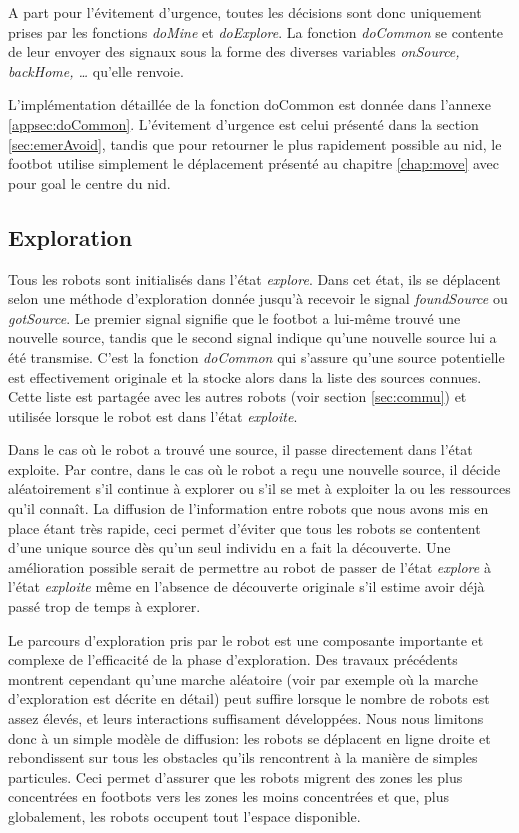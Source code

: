A part pour l'évitement d'urgence, toutes les décisions sont donc uniquement prises par les fonctions \emph{doMine} et \emph{doExplore}. La fonction \emph{doCommon} se contente de leur envoyer des signaux sous la forme des diverses variables \emph{onSource, backHome, \ldots} qu'elle renvoie.

L'implémentation détaillée de la fonction doCommon est donnée dans l'annexe \ref{appsec:doCommon}. L'évitement d'urgence est celui présenté dans la section \ref{sec:emerAvoid}, tandis que pour retourner le plus rapidement possible au nid, le footbot utilise simplement le déplacement présenté au chapitre \ref{chap:move} avec pour goal le centre du nid.

\subsection{Exploration\label{sec:explore}}

Tous les robots sont initialisés dans l'état \emph{explore}. Dans cet état, ils se déplacent selon une méthode d'exploration donnée jusqu'à recevoir le signal \emph{foundSource} ou \emph{gotSource}. Le premier signal signifie que le footbot a lui-même trouvé une nouvelle source, tandis que le second signal indique qu'une nouvelle source lui a été transmise. C'est la fonction \emph{doCommon} qui s'assure qu'une source potentielle est effectivement originale et la stocke alors dans la liste des sources connues. Cette liste est partagée avec les autres robots (voir section \ref{sec:commu}) et utilisée lorsque le robot est dans l'état \emph{exploite}.

Dans le cas où le robot a trouvé une source, il passe directement dans l'état exploite. Par contre, dans le cas où le robot a reçu une nouvelle source, il décide aléatoirement s'il continue à explorer ou s'il se met à exploiter la ou les ressources qu'il connaît. La diffusion de l'information entre robots que nous avons mis en place étant très rapide, ceci permet d'éviter que tous les robots se contentent d'une unique source dès qu'un seul individu en a fait la découverte. Une amélioration possible serait de permettre au robot de passer de l'état \emph{explore} à l'état \emph{exploite} même en l'absence de découverte originale s'il estime avoir déjà passé trop de temps à explorer.

Le parcours d'exploration pris par le robot est une composante importante et complexe de l'efficacité de la phase d'exploration. Des travaux précédents montrent cependant qu'une marche aléatoire (voir \cite{foraging} par exemple où la marche d'exploration est décrite en détail) peut suffire lorsque le nombre de robots est assez élevés, et leurs interactions suffisament développées. Nous nous limitons donc à un simple modèle de diffusion: les robots se déplacent en ligne droite et rebondissent sur tous les obstacles qu'ils rencontrent à la manière de simples particules. Ceci permet d'assurer que les robots migrent des zones les plus concentrées en footbots vers les zones les moins concentrées et que, plus globalement, les robots occupent tout l'espace disponible.

